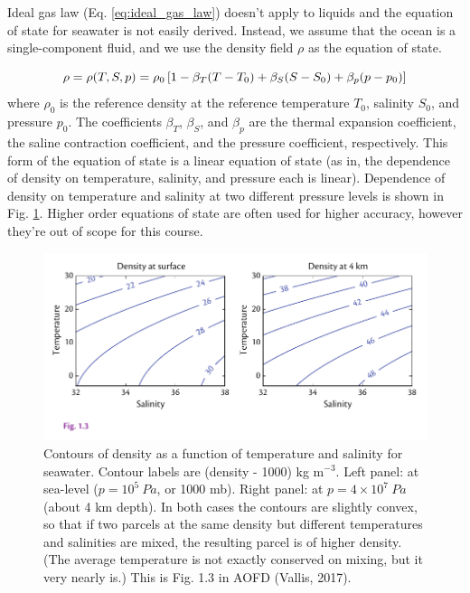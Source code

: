 \documentclass[12pt]{article}
\numberwithin{equation}{section}
\numberwithin{figure}{section}
\numberwithin{table}{section}
\begin{document}
Ideal gas law (Eq. \ref{eq:ideal_gas_law}) doesn't apply to liquids and the
equation of state for seawater is not easily derived.
Instead, we assume that the ocean is a single-component fluid, and we use the
density field $\rho$ as the equation of state.

\begin{equation}
  \rho = \rho(T, S, p) \\
  = \rho_0 \left[ 1 - \beta_T(T-T_0) + \beta_S(S-S_0) + \beta_p(p-p_0) \right]
  \label{eq:equation_of_state_ocean}
\end{equation}
where $\rho_0$ is the reference density at the reference temperature $T_0$,
salinity $S_0$, and pressure $p_0$.
The coefficients $\beta_T$, $\beta_S$, and $\beta_p$ are the thermal expansion
coefficient, the saline contraction coefficient, and the pressure
coefficient, respectively.
This form of the equation of state is a linear equation of state (as in, the
dependence of density on temperature, salinity, and pressure each is linear).
Dependence of density on temperature and salinity at two different pressure
levels is shown in Fig. \ref{fig:seawater_eqstate}.
Higher order equations of state are often used for higher accuracy, however
they're out of scope for this course.

\begin{figure}[h]
  \centering
  \includegraphics[width=\textwidth]{assets/fig_seawater_eqstate.pdf}
  \caption{
    Contours of density as a function of temperature and salinity for seawater.
    Contour labels are (density - 1000) kg m$^{-3}$.
    Left panel: at sea-level ($p = 10^5\ Pa$, or 1000 mb).
    Right panel: at $p = 4 \times 10^7\ Pa$ (about 4 km depth).
    In both cases the contours are slightly convex, so that if two parcels at
    the same density but different temperatures and salinities are mixed, the
    resulting parcel is of higher density.
    (The average temperature is not exactly conserved on mixing, but it very
    nearly is.)
    This is Fig. 1.3 in AOFD (Vallis, 2017).
  }
  \label{fig:seawater_eqstate}
\end{figure}
\end{document}
